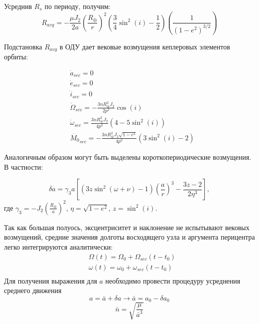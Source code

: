 Усреднив $R_s$ по периоду, получим:
\begin{equation*}
    R_{avg} =  - \frac{\mu J_2}{2 a} \left( \frac{R_\oplus}{r} \right)^2 
                \left( \frac{3}{4} \sin^2(i) - \frac{1}{2} \right)
                \left( \frac{1}{(1 - e^2)^{3/2}} \right)
\end{equation*}

Подстановка $R_{avg}$ в ОДУ дает вековые возмущения кеплеровых элементов орбиты:

\begin{align*}
    & \dot{a}_{sec} = 0 \\
    & \dot{e}_{sec} = 0 \\
    & \dot{i}_{sec} = 0 \\
    & \dot{\Omega}_{sec} = - \frac{3 n R^{2}_\oplus J_2}{2 p^2} \cos(i) \\
    & \dot{\omega}_{sec} = \frac{3 n R^{2}_\oplus J_2}{4 p^2} (4 - 5 \sin^2(i)) \\
    & \dot{M_0}_{sec} = - \frac{3 n R^{2}_\oplus J_2 \sqrt{1 - e^2}}{4 p ^2}
                            (3 \sin^2(i) - 2)
\end{align*}

Аналогичным образом могут быть выделены короткопериодические возмущения. В частности:

\begin{equation*}
    \delta a = \gamma_3 a \left[ (3z \sin^2(\omega + \nu) - 1) \left(\frac{a}{r}\right)^3
                                    - \frac{3z - 2}{2 \eta^3}  \right],
\end{equation*}
где $\gamma_3 = -J_2 \left(\frac{R_\oplus}{a}\right)^2$, $\eta = \sqrt{1 - e^2}$, $z = \sin^2(i)$.

Так как большая полуось, эксцентриситет и наклонение не испытывают вековых возмущений, 
средние значения долготы восходящего узла и аргумента перицентра легко интегрируются аналитически:
\begin{align*}
    & \Omega(t) = \Omega_0 + \Omega_{sec} (t - t_0) \\
    & \omega(t) = \omega_0 + \omega_{sec} (t - t_0) \\
\end{align*}
Для получения выражения для $a$ необходимо провести процедуру усреднения среднего движения
\begin{equation*}
    a = \bar{a} + \delta a \rightarrow  \bar{a} = a_0 - \delta a_0
\end{equation*}
\begin{equation*}
    \bar{n} = \sqrt{\frac{\mu}{\bar{a}^3}}
\end{equation*}

